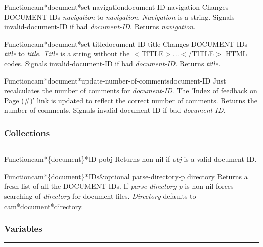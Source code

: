 \begin{functiondoc}{Function}{cam*document*set-navigation}{document-ID navigation}
Changes DOCUMENT-IDs {\em navigation} to {\em navigation}.
{\em Navigation} is a string.
Signals invalid-document-ID if bad {\em document-ID}.
Returns {\em navigation}.
\end{functiondoc}

\begin{functiondoc}{Function}{cam*document*set-title}{document-ID title}
Changes DOCUMENT-IDs {\em title} to {\em title}.
{\em Title} is a string without the $<$TITLE$>$...$<$/TITLE$>$ HTML codes.
Signals invalid-document-ID if bad {\em document-ID}.
Returns {\em title}.
\end{functiondoc}

\begin{functiondoc}{Function}{cam*document*update-number-of-comments}{document-ID}
Just recalculates the number of comments for {\em document-ID}.  The 'Index of 
feedback on Page (\#)' link is updated to reflect the correct number of comments.
Returns the number of comments.
Signals invalid-document-ID if bad {\em document-ID}.
\end{functiondoc}


\subsubsection*{Collections}
\par\vspace*{0.00in}\par\hrule\par\medskip\par


\begin{functiondoc}{Function}{cam*\{document\}*ID-p}{obj}
Returns non-nil if {\em obj} is a valid document-ID.
\end{functiondoc}

\begin{functiondoc}{Function}{cam*\{document\}*IDs}{\&optional parse-directory-p directory}
Returns a fresh list of all the DOCUMENT-IDs.
If {\em parse-directory-p} is non-nil forces searching of {\em directory} for document files.
{\em Directory} defaults to cam*document*directory.
\end{functiondoc}


\subsubsection*{Variables}
\par\vspace*{0.00in}\par\hrule\par\medskip\par


